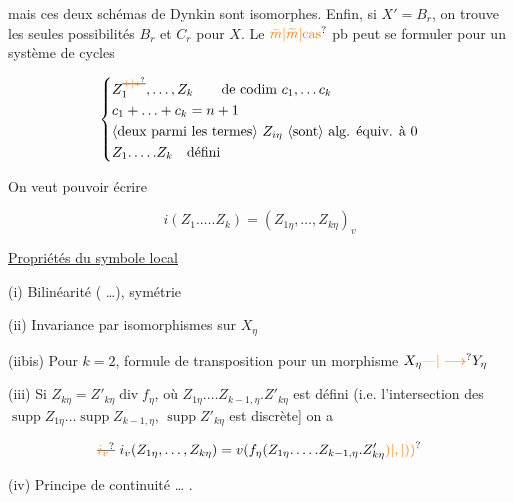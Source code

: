 mais ces deux schémas de Dynkin sont isomorphes. Enfin, si $X'=B_r$, on trouve les
seules possibilités $B_r$ et $C_r$ pour $X$.
Le $\unsure{\bar m|\widetilde m|\text{cas}}$ pb peut se formuler pour un
système de cycles

\[
\left\{\begin{aligned}
&Z_1^{\deleted{\unsure{+|*}}},\ldots,Z_k\qquad\text{de codim }c_1,\ldots c_k\\
&c_1+\ldots+c_k=n+1\\
&\text{\inserted{deux parmi les termes}}\ Z_{i\eta}\ \text{\inserted{sont} alg. équiv. à }0\\
&Z_1.\ldots.Z_k\quad\text{défini}
\end{aligned}\right.
\]

On veut pouvoir écrire

\[
 i(Z_1.\ldots.Z_k)=(Z_{1\eta},\ldots,Z_{k\eta})_v
\]

\uline{Propriétés du symbole local}

(i) Bilinéarité ( \ldots), symétrie

(ii) Invariance par isomorphismes sur $X_\eta$

(iibis) Pour $k=2$, formule de transposition
pour un morphisme $X_\eta\unsure{\text{---}|\longrightarrow}Y_\eta$

(iii)   Si $Z_{k\eta}=Z'_{k\eta}\operatorname{div}f_\eta$,
 où $Z_{1\eta}.\ldots Z_{k-1,\eta}.Z'_{k\eta}$ est défini (i.e.
l’intersection des $\operatorname{supp}Z_{1\eta}\ldots\operatorname{supp}Z_{k-1,\eta}$, $\operatorname{supp}Z'_{k\eta}$
est discrète] on a

\[
 \deleted{\unsure{i_v}}\ i_v(Z_{1\eta},\ldots,Z_{k\eta})=v(f_\eta(Z_{1\eta}.\ldots.Z_{k-1,\eta}.Z'_{k\eta} \unsure{)|,|))}
\]

(iv) Principe de continuité \ldots{} .

